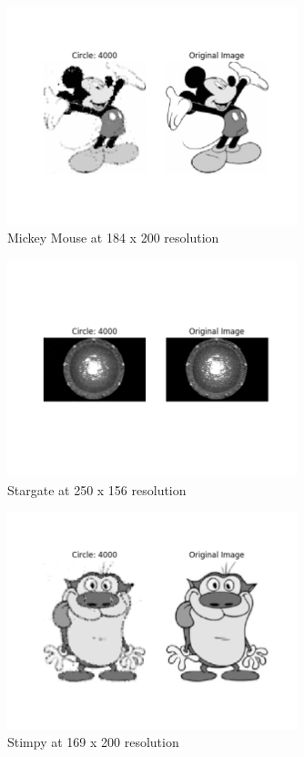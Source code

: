 \documentclass[12pt]{article}
\begin{document}
\begin{figure}[H]
\centering
\noindent\includegraphics[width=0.75\textwidth]{../results/mickey/mickey_4000}
\caption{Mickey Mouse at 184 x 200 resolution}
\end{figure}

\begin{figure}[H]
\centering
\noindent\includegraphics[width=0.75\textwidth]{../results/stargate/stargate_4000}
\caption{Stargate at 250 x 156 resolution}
\end{figure}

\begin{figure}[H]
\centering
\noindent\includegraphics[width=0.75\textwidth]{../results/stimpy/stimpy_4000}
\caption{Stimpy at 169 x 200 resolution}
\end{figure}
\end{document}
